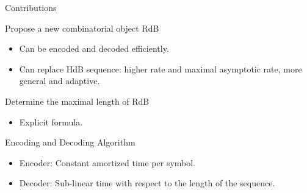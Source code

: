 \begin{frame}{Contributions}
    \begin{block}{Propose a new combinatorial object RdB}
        \begin{itemize}
            \item Can be encoded and decoded efficiently.
            \item Can replace HdB sequence: higher rate and maximal asymptotic rate, more general and adaptive.
        \end{itemize}
    \end{block}
    \begin{block}{Determine the maximal length of RdB}
        \begin{itemize}
            \item Explicit formula.
        \end{itemize}
    \end{block}
    \begin{block}{Encoding and Decoding Algorithm}
        \begin{itemize}
            \item Encoder: Constant amortized time per symbol.
            \item Decoder: Sub-linear time with respect to the length of the sequence.
        \end{itemize}
    \end{block}
\end{frame} 

